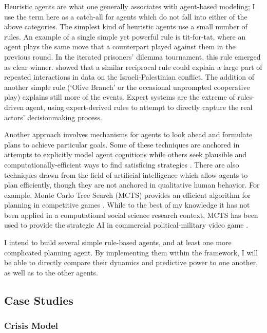 Heuristic agents are what one generally associates with agent-based modeling; I use the term here as a catch-all for agents which do not fall into either of the above categories. The simplest kind of heuristic agents use a small number of rules. An example of a single simple yet powerful rule is tit-for-tat, where an agent plays the same move that a counterpart played against them in the previous round. In the \citet{axelrod_1980} iterated prisoners' dilemma tournament, this rule emerged as clear winner. \citet{hudson_2004} showed that a similar reciprocal rule could explain a large part of repeated interactions in data on the Israeli-Palestinian conflict. The addition of another simple rule (`Olive Branch' or the occasional unprompted cooperative play) explains still more of the events. Expert systems \citep{taber_1992} are the extreme of rules-driven agent, using expert-derived rules to attempt to directly capture the real actors' decisionmaking process.

Another approach involves mechanisms for agents to look ahead and formulate plans to achieve particular goals. Some of these techniques are anchored in attempts to explicitly model agent cognitions \citep{balke_2014} while others seek plausible and computationally-efficient ways to find satisficing strategies \citep{latek_2009}. There are also techniques drawn from the field of artificial intelligence which allow agents to plan efficiently, though they are not anchored in qualitative human behavior. For example, Monte Carlo Tree Search (MCTS) provides an efficient algorithm for planning in competitive games \citep{chaslot_2008}. While to the best of my knowledge it has not been applied in a computational social science research context, MCTS has been used to provide the strategic AI in commercial political-military video game \citep{champandard_2014}.

I intend to build several simple rule-based agents, and at least one more complicated planning agent. By implementing them within the framework, I will be able to directly compare their dynamics and predictive power to one another, as well as to the other agents.

\subsection{Case Studies}\label{case-studies}

\subsubsection{Crisis Model}\label{crisis-model}

